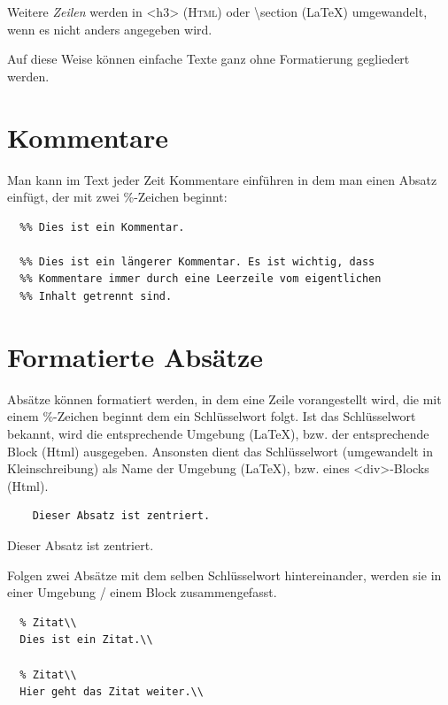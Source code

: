 \documentclass{scrartcl}
\begin{document}
Weitere \emph{Zeilen} werden in <h3> (\textsc{Html}) oder \textbackslash section
(LaTeX) umgewandelt, wenn es nicht anders angegeben wird.

Auf diese Weise können einfache Texte ganz ohne Formatierung
gegliedert werden.

\section{Kommentare}

Man kann im Text jeder Zeit Kommentare einführen in dem man einen Absatz einfügt, der mit zwei \%-Zeichen beginnt:

\begin{verbatim}
  %% Dies ist ein Kommentar.

  %% Dies ist ein längerer Kommentar. Es ist wichtig, dass
  %% Kommentare immer durch eine Leerzeile vom eigentlichen
  %% Inhalt getrennt sind.

\end{verbatim}



\section{Formatierte Absätze}

Absätze können formatiert werden, in dem eine Zeile
vorangestellt wird, die mit einem \%-Zeichen beginnt dem ein
Schlüsselwort folgt. Ist das Schlüsselwort bekannt, wird
die entsprechende Umgebung (LaTeX), bzw. der entsprechende
Block (Html) ausgegeben. Ansonsten dient das Schlüsselwort
(umgewandelt in Kleinschreibung) als Name der Umgebung
(LaTeX), bzw. eines <div>-Blocks (Html).

\begin{verbatim}
	Dieser Absatz ist zentriert.

\end{verbatim}

\begin{center}
Dieser Absatz ist zentriert.

\end{center}

Folgen zwei Absätze mit dem selben Schlüsselwort
hintereinander, werden sie in einer Umgebung / einem Block
zusammengefasst.

\begin{verbatim}
  % Zitat\\
  Dies ist ein Zitat.\\

  % Zitat\\
  Hier geht das Zitat weiter.\\

\end{verbatim}
\end{document}
